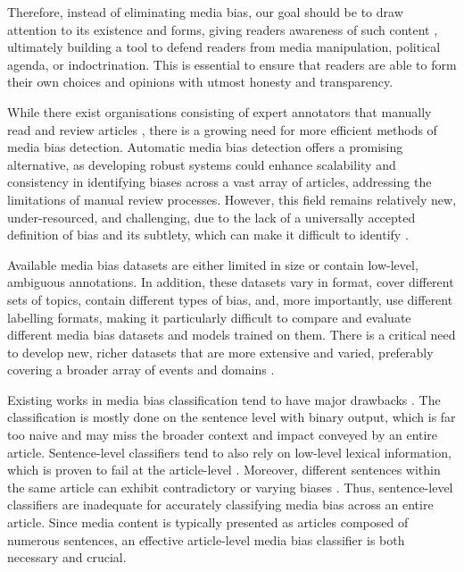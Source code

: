 Therefore, instead of eliminating media bias, our goal should be to draw attention to its existence and forms, giving readers awareness of such content \cite{spinde-2024-taxonomy}, ultimately building a tool to defend readers from media manipulation, political agenda, or indoctrination. This is essential to ensure that readers are able to form their own choices and opinions with utmost honesty and transparency.


While there exist organisations consisting of expert annotators that manually read and review articles \cite{adfontes, allsides, mbfc}, there is a growing need for more efficient methods of media bias detection. Automatic media bias detection offers a promising alternative, as developing robust systems could enhance scalability and consistency in identifying biases across a vast array of articles, addressing the limitations of manual review processes. However, this field remains relatively new, under-resourced, and challenging, due to the lack of a universally accepted definition of bias and its subtlety, which can make it difficult to identify \cite{rodrigo-2024-systematic-review-media-bias}.

Available media bias datasets \cite{spinde-2021-babe,fan-2019-basil,chen-2020-nlpcss,spinde-2023-bat,gruppi-2023-nela-gt-2022} are either limited in size or contain low-level, ambiguous annotations. In addition, these datasets vary in format, cover different sets of topics, contain different types of bias, and, more importantly, use different labelling formats, making it particularly difficult to compare and evaluate different media bias datasets and models trained on them. There is a critical need to develop new, richer datasets that are more extensive and varied, preferably covering a broader array of events and domains \cite{rodrigo-2024-systematic-review-media-bias}.

Existing works in media bias classification tend to have major drawbacks \cite{maab-2023-lexical-bias-detection, maab-2023-target-aware, guo-2022-modeling, van-den-berg-2020-context,lee-2021-unifying,lei-2022-sentence,lei-2024-event-relation}. The classification is mostly done on the sentence level with binary output, which is far too naive and may miss the broader context and impact conveyed by an entire article. Sentence-level classifiers tend to also rely on low-level lexical information, which is proven to fail at the article-level \cite{chen-2020-detecting-media-bias-gaussian}. Moreover, different sentences within the same article can exhibit contradictory or varying biases \cite{lei-2022-sentence}. Thus, sentence-level classifiers are inadequate for accurately classifying media bias across an entire article. Since media content is typically presented as articles composed of numerous sentences, an effective article-level media bias classifier is both necessary and crucial.

